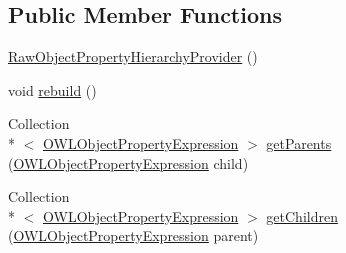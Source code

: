 \subsection*{Public Member Functions}
\begin{DoxyCompactItemize}
\item 
\hyperlink{classorg_1_1semanticweb_1_1owlapi_1_1reasoner_1_1structural_1_1_structural_reasoner_1_1_raw_object_property_hierarchy_provider_a830b5a422724fca6eeae8bbecb801509}{Raw\-Object\-Property\-Hierarchy\-Provider} ()
\item 
void \hyperlink{classorg_1_1semanticweb_1_1owlapi_1_1reasoner_1_1structural_1_1_structural_reasoner_1_1_raw_object_property_hierarchy_provider_a4c36664f75a270c6e64a4172d0bb82af}{rebuild} ()
\item 
Collection\\*
$<$ \hyperlink{interfaceorg_1_1semanticweb_1_1owlapi_1_1model_1_1_o_w_l_object_property_expression}{O\-W\-L\-Object\-Property\-Expression} $>$ \hyperlink{classorg_1_1semanticweb_1_1owlapi_1_1reasoner_1_1structural_1_1_structural_reasoner_1_1_raw_object_property_hierarchy_provider_ae83fb451a1ee3575ae36c1a156aa725b}{get\-Parents} (\hyperlink{interfaceorg_1_1semanticweb_1_1owlapi_1_1model_1_1_o_w_l_object_property_expression}{O\-W\-L\-Object\-Property\-Expression} child)
\item 
Collection\\*
$<$ \hyperlink{interfaceorg_1_1semanticweb_1_1owlapi_1_1model_1_1_o_w_l_object_property_expression}{O\-W\-L\-Object\-Property\-Expression} $>$ \hyperlink{classorg_1_1semanticweb_1_1owlapi_1_1reasoner_1_1structural_1_1_structural_reasoner_1_1_raw_object_property_hierarchy_provider_ac9f8fe8e50725a5cb85f4ca6cfe5039d}{get\-Children} (\hyperlink{interfaceorg_1_1semanticweb_1_1owlapi_1_1model_1_1_o_w_l_object_property_expression}{O\-W\-L\-Object\-Property\-Expression} parent)
\end{DoxyCompactItemize}
